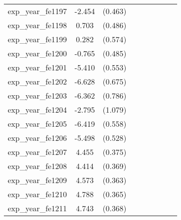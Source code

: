 {\begin{tabular}{l*{4}{cc}}
exp\_year\_fe1197&   -2.454\sym{***}&  (0.463)&                  &         &                  &         &                  &         \\
exp\_year\_fe1198&    0.703         &  (0.486)&                  &         &                  &         &                  &         \\
exp\_year\_fe1199&    0.282         &  (0.574)&                  &         &                  &         &                  &         \\
exp\_year\_fe1200&   -0.765         &  (0.485)&                  &         &                  &         &                  &         \\
exp\_year\_fe1201&   -5.410\sym{***}&  (0.553)&                  &         &                  &         &                  &         \\
exp\_year\_fe1202&   -6.628\sym{***}&  (0.675)&                  &         &                  &         &                  &         \\
exp\_year\_fe1203&   -6.362\sym{***}&  (0.786)&                  &         &                  &         &                  &         \\
exp\_year\_fe1204&   -2.795\sym{**} &  (1.079)&                  &         &                  &         &                  &         \\
exp\_year\_fe1205&   -6.419\sym{***}&  (0.558)&                  &         &                  &         &                  &         \\
exp\_year\_fe1206&   -5.498\sym{***}&  (0.528)&                  &         &                  &         &                  &         \\
exp\_year\_fe1207&    4.455\sym{***}&  (0.375)&                  &         &                  &         &                  &         \\
exp\_year\_fe1208&    4.414\sym{***}&  (0.369)&                  &         &                  &         &                  &         \\
exp\_year\_fe1209&    4.573\sym{***}&  (0.363)&                  &         &                  &         &                  &         \\
exp\_year\_fe1210&    4.788\sym{***}&  (0.365)&                  &         &                  &         &                  &         \\
exp\_year\_fe1211&    4.743\sym{***}&  (0.368)&                  &         &                  &         &                  &         \\

\end{tabular}}
